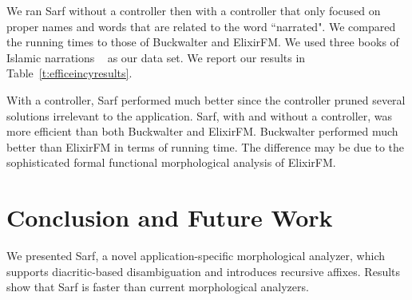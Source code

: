 \documentclass[11pt]{article}
\begin{document}
\begin{table}[tb]
\centering
\caption{Results of Sarf, Buckwalter and ElixirFM.}
\normalsize
\label{t:efficeincyresults}
\end{table}

We ran Sarf without a controller then with a controller that only 
focused on proper names and words that are related to the word ``narrated".
We compared the running times to those of Buckwalter and ElixirFM.
We used three books of Islamic narrations  ~\cite{IbnHanbal,AlTousi,AlKulayni} as our data set.
We report our results in Table~\ref{t:efficeincyresults}.

With a controller, Sarf performed much better since the controller pruned several solutions irrelevant to the application. 
Sarf, with and without a controller, was more efficient than both Buckwalter and ElixirFM. 
Buckwalter performed much better than ElixirFM in 
terms of running time. 
The difference may be due to the sophisticated formal 
functional morphological analysis of ElixirFM. 

\section{Conclusion and Future Work}
\label{sec:future}

We presented Sarf, a novel application-specific morphological analyzer,
which supports diacritic-based disambiguation and introduces recursive affixes.
Results show that Sarf is faster than
current morphological analyzers.
\end{document}
